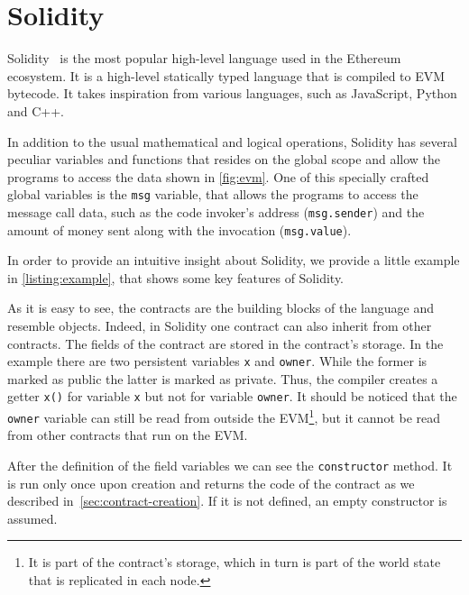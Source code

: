 \section{Solidity}
\label{sec:solidity}
Solidity~\cite{bib:solidity-docs} is the most popular high-level language used
in the Ethereum ecosystem. It is a high-level statically typed language that is
compiled to EVM bytecode. It takes inspiration from various languages, such as
JavaScript, Python and C++.

In addition to the usual mathematical and logical operations, Solidity has
several peculiar variables and functions that resides on the global scope and
allow the programs to access the data shown in \autoref{fig:evm}. One of this
specially crafted global variables is the \texttt{msg} variable, that allows the
programs to access the message call data, such as the code invoker's address
(\texttt{msg.sender}) and the amount of money sent along with the invocation
(\texttt{msg.value}).

In order to provide an intuitive insight about Solidity, we provide a little
example in \autoref{listing:example}, that shows some key features of Solidity.

\begin{figure}[!h] 
\end{figure}

As it is easy to see, the contracts are the building blocks of the language and
resemble objects. Indeed, in Solidity one contract can also inherit from other
contracts. The fields of the contract are stored in the contract's storage. In
the example there are two persistent variables \verb|x| and \verb|owner|. While
the former is marked as public the latter is marked as private. Thus, the
compiler creates a getter \verb|x()| for variable \verb|x| but not for variable
\verb|owner|. It should be noticed that the \verb|owner| variable can still be
read from outside the EVM\footnote{It is part of the contract's storage, which
in turn is part of the world state that is replicated in each node.}, but it
cannot be read from other contracts that run on the EVM.


After the definition of the field variables we can see the \texttt{constructor}
method. It is run only once upon creation and returns the code of the contract
as we described in~\autoref{sec:contract-creation}. If it is not defined, an
empty constructor is assumed.

